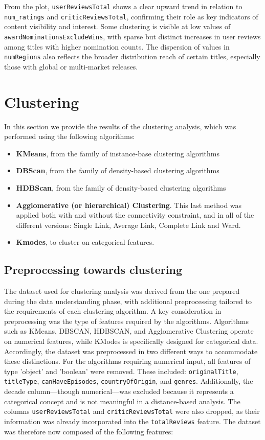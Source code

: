 \documentclass[10pt]{article}
\begin{document}
From the plot, \texttt{userReviewsTotal} shows a clear upward trend in relation to \texttt{num\_ratings} and \texttt{criticReviewsTotal}, confirming their role as key indicators of content visibility and interest. Some clustering is visible at low values of \texttt{awardNominationsExcludeWins}, with sparse but distinct increases in user reviews among titles with higher nomination counts. The dispersion of values in \texttt{numRegions} also reflects the broader distribution reach of certain titles, especially those with global or multi-market releases.


\section{Clustering}
In this section we provide the results of the clustering analysis, which was performed using the following algorithms:

\begin{itemize}
    \item\textbf{KMeans}, from the family of instance-base clustering algorithms
    \item\textbf{DBScan}, from the family of density-based clustering algorithms
    \item\textbf{HDBScan}, from the family of density-based clustering algorithms
    \item\textbf{Agglomerative (or hierarchical) Clustering}. This last method was applied both with and without the connectivity constraint, and in all of the different versions: Single Link, Average Link, Complete Link and Ward.
    \item\textbf{Kmodes}, to cluster on categorical features.
\end{itemize}

\subsection{Preprocessing towards clustering}
The dataset used for clustering analysis was derived from the one prepared during the data understanding phase, with additional preprocessing tailored to the requirements of each clustering algorithm.
A key consideration in preprocessing was the type of features required by the algorithms. Algorithms such as KMeans, DBSCAN, HDBSCAN, and Agglomerative Clustering operate on numerical features, while KModes is specifically designed for categorical data. Accordingly, the dataset was preprocessed in two different ways to accommodate these distinctions.
For the algorithms requiring numerical input, all features of type 'object' and 'boolean' were removed. These included: \texttt{originalTitle}, \texttt{titleType}, \texttt{canHaveEpisodes}, \texttt{countryOfOrigin}, and \texttt{genres}. Additionally, the decade column—though numerical—was excluded because it represents a categorical concept and is not meaningful in a distance-based analysis. The columns \texttt{userReviewsTotal} and \texttt{criticReviewsTotal} were also dropped, as their information was already incorporated into the \texttt{totalReviews} feature.
The dataset was therefore now composed of the following features: 
\end{document}
